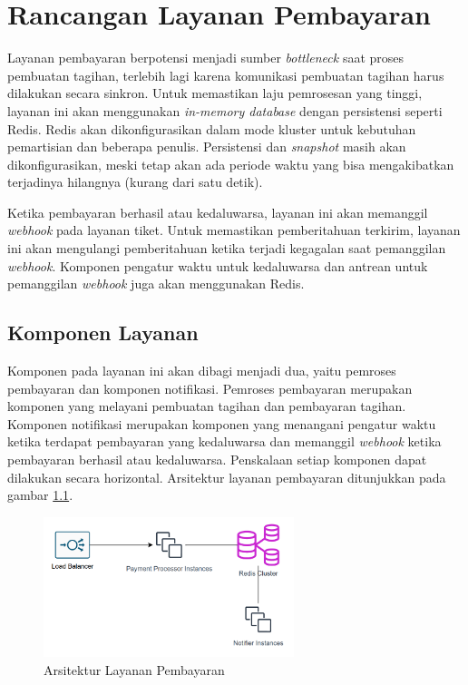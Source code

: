 \chapter{Rancangan Layanan Pembayaran}
\label{apx:payment-service}

Layanan pembayaran berpotensi menjadi sumber \textit{bottleneck} saat proses pembuatan tagihan, terlebih lagi karena komunikasi pembuatan tagihan harus dilakukan secara sinkron. Untuk memastikan laju pemrosesan yang tinggi, layanan ini akan menggunakan \textit{in-memory database} dengan persistensi seperti Redis. Redis akan dikonfigurasikan dalam mode kluster untuk kebutuhan pemartisian dan beberapa penulis. Persistensi dan \textit{snapshot} masih akan dikonfigurasikan, meski tetap akan ada periode waktu yang bisa mengakibatkan terjadinya hilangnya (kurang dari satu detik).

Ketika pembayaran berhasil atau kedaluwarsa, layanan ini akan memanggil \textit{webhook} pada layanan tiket. Untuk memastikan pemberitahuan terkirim, layanan ini akan mengulangi pemberitahuan ketika terjadi kegagalan saat pemanggilan \textit{webhook}. Komponen pengatur waktu untuk kedaluwarsa dan antrean untuk pemanggilan \textit{webhook} juga akan menggunakan Redis.

\section{Komponen Layanan}

Komponen pada layanan ini akan dibagi menjadi dua, yaitu pemroses pembayaran dan komponen notifikasi. Pemroses pembayaran merupakan komponen yang melayani pembuatan tagihan dan pembayaran tagihan. Komponen notifikasi merupakan komponen yang menangani pengatur waktu ketika terdapat pembayaran yang kedaluwarsa dan  memanggil \textit{webhook} ketika pembayaran berhasil atau kedaluwarsa. Penskalaan setiap komponen dapat dilakukan secara horizontal. Arsitektur layanan pembayaran ditunjukkan pada gambar \ref{fig:payment-service-deployment}.

\pagebreak

\begin{figure}[htbp]
    \centering
    \includegraphics[width=0.65\textwidth]{resources/chapter-3/payment-service.png}
    \caption{Arsitektur Layanan Pembayaran}
    \label{fig:payment-service-deployment}
\end{figure}

